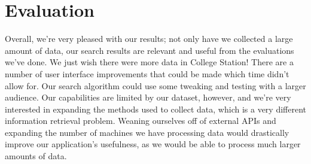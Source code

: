 \documentclass{article}
\begin{document}
\section{Evaluation}
Overall, we're very pleased with our results; not only have we collected a large amount of data, our search results are relevant and useful from the evaluations we've done. We just wish there were more data in College Station! There are a number of user interface improvements that could be made which time didn't allow for. Our search algorithm could use some tweaking and testing with a larger audience. Our capabilities are limited by our dataset, however, and we're very interested in expanding the methods used to collect data, which is a very different information retrieval problem. Weaning ourselves off of external APIs and expanding the number of machines we have processing data would drastically improve our application's usefulness, as we would be able to process much larger amounts of data.
\end{document}
